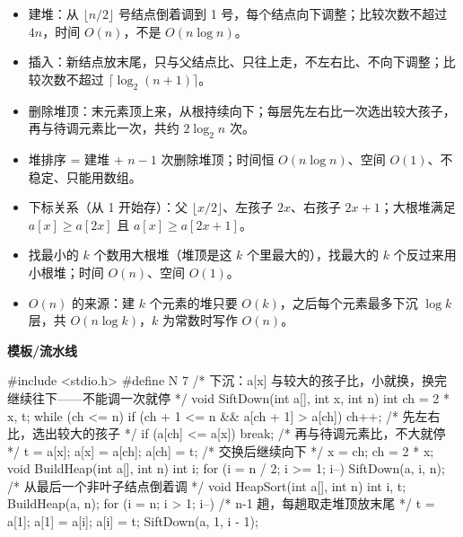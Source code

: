 \documentclass[10pt,a4paper]{ctexart}
\begin{document}
\begin{itemize}

\item 建堆：从 $\lfloor n/2\rfloor$ 号结点倒着调到 1 号，每个结点向下调整；比较次数不超过 $4n$，时间 $O(n)$，不是 $O(n\log n)$。

\item 插入：新结点放末尾，只与父结点比、只往上走，不左右比、不向下调整；比较次数不超过 $\lceil\log_2(n+1)\rceil$。

\item 删除堆顶：末元素顶上来，从根持续向下；每层先左右比一次选出较大孩子，再与待调元素比一次，共约 $2\log_2 n$ 次。

\item 堆排序 = 建堆 + $n-1$ 次删除堆顶；时间恒 $O(n\log n)$、空间 $O(1)$、不稳定、只能用数组。

\item 下标关系（从 1 开始存）：父 $\lfloor x/2\rfloor$、左孩子 $2x$、右孩子 $2x+1$；大根堆满足 $a[x]\ge a[2x]$ 且 $a[x]\ge a[2x+1]$。

\item 找最小的 $k$ 个数用大根堆（堆顶是这 $k$ 个里最大的），找最大的 $k$ 个反过来用小根堆；时间 $O(n)$、空间 $O(1)$。

\item $O(n)$ 的来源：建 $k$ 个元素的堆只要 $O(k)$，之后每个元素最多下沉 $\log k$ 层，共 $O(n\log k)$，$k$ 为常数时写作 $O(n)$。

\end{itemize}

\textbf{模板/流水线}

\begin{codebox}
#include <stdio.h>
#define N 7
/* 下沉：a[x] 与较大的孩子比，小就换，换完继续往下——不能调一次就停 */
void SiftDown(int a[], int x, int n) {
    int ch = 2 * x, t;
    while (ch <= n) {
        if (ch + 1 <= n && a[ch + 1] > a[ch]) ch++;  /* 先左右比，选出较大的孩子 */
        if (a[ch] <= a[x]) break;                    /* 再与待调元素比，不大就停 */
        t = a[x]; a[x] = a[ch]; a[ch] = t;           /* 交换后继续向下 */
        x = ch; ch = 2 * x;
    }
}
void BuildHeap(int a[], int n) {
    int i;
    for (i = n / 2; i >= 1; i--) SiftDown(a, i, n);  /* 从最后一个非叶子结点倒着调 */
}
void HeapSort(int a[], int n) {
    int i, t;
    BuildHeap(a, n);
    for (i = n; i > 1; i--) {                        /* n-1 趟，每趟取走堆顶放末尾 */
        t = a[1]; a[1] = a[i]; a[i] = t;
        SiftDown(a, 1, i - 1);
    }
}
\end{codebox}
\end{document}

